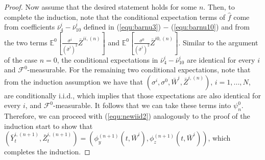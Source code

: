 \documentclass[10pt,a4paper]{article}
\theoremstyle{plain}
\theoremstyle{definition}
\numberwithin{equation}{section}
\begin{document}
\begin{proof}
Now assume that the desired statement holds for some $n$. Then, to complete the induction, note that the 
conditional expectation terms of $\hat{f}$ come from coefficients $\bar{\nu}_{4}^{i}-\bar{\nu}_{10}^{i}$ defined in (\ref{equ:barnu3}) $-$ (\ref{equ:barnu10}) and from the two terms $\mathbb{E}^{0}[\tfrac{{\sigma}^{i}}{(\bar{\sigma}^{i})^{2}}\bar{Z}^{ii,(n)}]$ and $\mathbb{E}^{0}[\tfrac{{\sigma}^{0}}{(\bar{\sigma}^{i})^{2}}\bar{Z}^{i0,(n)}]$. Similar to the argument of the case $n=0$, the conditional expectations in $\bar{\nu}_{4}^{i}-\bar{\nu}_{10}^{i}$ are identical for every $i$ and $\mathcal{F}^{0}$-measurable. For the remaining two conditional expectations, note that from the induction assumption we have that $(\sigma^i, \sigma^0, \bar{W}^i, \bar{Z}^{i,(n)})$, $i =1,...,N$, are conditionally i.i.d., which implies that those expectations are also identical for every $i$, and $\mathcal{F}^{0}$-measurable. It follows that we can take these terms into $\psi_{n}^{0}$. Therefore, we can proceed with (\ref{equ:newiid2}) analogously to the proof of the induction start to show that $(\bar{Y}_{t}^{i,(n+1)},\bar{Z}_{t}^{i,(n+1)}) = (\phi_{y}^{(n+1)}(t,\bar{W}^{i}),\phi_{z}^{(n+1)}(t,\bar{W}^{i}))$, which completes the induction.

    
\end{proof}









 
\end{document}
